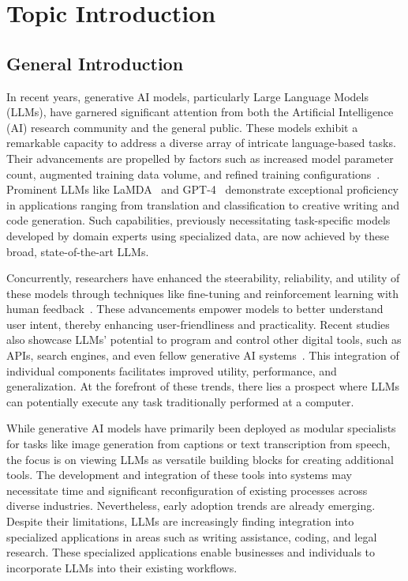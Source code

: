 \documentclass[a4paper,oneside]{book}
\begin{document}
\newpage
{}
\setcounter{page}{6}
\tableofcontents

\newpage
\listoffigures

\newpage
\listoftables

\newpage
{}
\setcounter{page}{1}
\chapter{Topic Introduction}

\section{General Introduction}
In recent years, generative AI models, particularly Large Language Models (LLMs), have garnered significant attention from both the Artificial Intelligence (AI) research community and the general public. These models exhibit a remarkable capacity to address a diverse array of intricate language-based tasks. Their advancements are propelled by factors such as increased model parameter count, augmented training data volume, and refined training configurations~\cite{brown2020language, radford2019language, hernandez2021scaling, kaplan2020scaling}. Prominent LLMs like LaMDA~\cite{thoppilan2022lamda} and GPT-4~\cite{openai2023gpt4} demonstrate exceptional proficiency in applications ranging from translation and classification to creative writing and code generation. Such capabilities, previously necessitating task-specific models developed by domain experts using specialized data, are now achieved by these broad, state-of-the-art LLMs.

Concurrently, researchers have enhanced the steerability, reliability, and utility of these models through techniques like fine-tuning and reinforcement learning with human feedback~\cite{ouyang2022training, bai2022training}. These advancements empower models to better understand user intent, thereby enhancing user-friendliness and practicality. Recent studies also showcase LLMs' potential to program and control other digital tools, such as APIs, search engines, and even fellow generative AI systems~\cite{schick2023toolformer, mialon2023augmented}. This integration of individual components facilitates improved utility, performance, and generalization. At the forefront of these trends, there lies a prospect where LLMs can potentially execute any task traditionally performed at a computer.

While generative AI models have primarily been deployed as modular specialists for tasks like image generation from captions or text transcription from speech, the focus is on viewing LLMs as versatile building blocks for creating additional tools. The development and integration of these tools into systems may necessitate time and significant reconfiguration of existing processes across diverse industries. Nevertheless, early adoption trends are already emerging. Despite their limitations, LLMs are increasingly finding integration into specialized applications in areas such as writing assistance, coding, and legal research. These specialized applications enable businesses and individuals to incorporate LLMs into their existing workflows.
\end{document}
